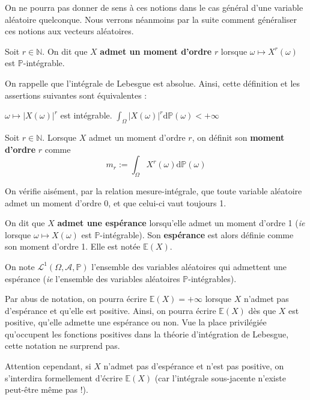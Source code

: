\documentclass[../integ-proba.tex]{subfiles}
\begin{document}
On ne pourra pas donner de sens à ces notions dans le cas général d'une variable aléatoire quelconque.
Nous verrons néanmoins par la suite comment généraliser ces notions aux vecteurs aléatoires.

\begin{defi}
    Soit $r\in\mathbb{N}$. On dit que $X$ \textbf{admet un moment d'ordre} $r$ lorsque $\omega \mapsto X^r(\omega)$ est $\mathbb{P}$-intégrable.
\end{defi}

\begin{rem}
    On rappelle que l'intégrale de Lebesgue est absolue. Ainsi, cette définition et les assertions suivantes sont équivalentes :
    \begin{itemize}
        \itemb $\omega \mapsto \left|X(\omega)\right|^r$ est intégrable.
        \itemb $\displaystyle \int_\Omega\left|X(\omega)\right|^r\text{d}\mathbb{P}(\omega) < +\infty$
    \end{itemize}
\end{rem}

\begin{defi}
    Soit $r\in\mathbb{N}$. Lorsque $X$ admet un moment d'ordre $r$, on définit son \textbf{moment d'ordre } $r$ comme
    $$m_r := \int_\Omega X^r(\omega)\text{d}\mathbb{P}(\omega)$$
\end{defi}

\begin{rem}
    On vérifie aisément, par la relation mesure-intégrale, que toute variable aléatoire admet un moment d'ordre 0, et que celui-ci vaut toujours 1.
\end{rem}

\begin{defi}
    On dit que $X$ \textbf{admet une espérance} lorsqu'elle admet un moment d'ordre 1 (\textit{ie} lorsque $\omega \mapsto X\left(\omega\right)$ est $\mathbb{P}$-intégrable).
    Son \textbf{espérance} est alors définie comme son moment d'ordre 1.
    Elle est notée $\mathbb{E}(X)$.

    On note $\mathcal{L}^1\left(\Omega, \mathcal{A}, \mathbb{P}\right)$ l'ensemble des variables aléatoires qui admettent une espérance (\textit{ie} l'ensemble des variables aléatoires $\mathbb{P}$-intégrables).
\end{defi}

\begin{rem}
    Par abus de notation, on pourra écrire $\mathbb{E}(X)=+\infty$ lorsque $X$ n'admet pas d'espérance et qu'elle est positive.
    Ainsi, on pourra écrire $\mathbb{E}(X)$ dès que $X$ est positive, qu'elle admette une espérance ou non.
    Vue la place privilégiée qu'occupent les fonctions positives dans la théorie d'intégration de Lebesgue, cette notation ne surprend pas.
    
    Attention cependant, si $X$ n'admet pas d'espérance et n'est pas positive, on s'interdira formellement d'écrire $\mathbb{E}(X)$ (car l'intégrale sous-jacente n'existe peut-être même pas !).
\end{rem}
\end{document}
